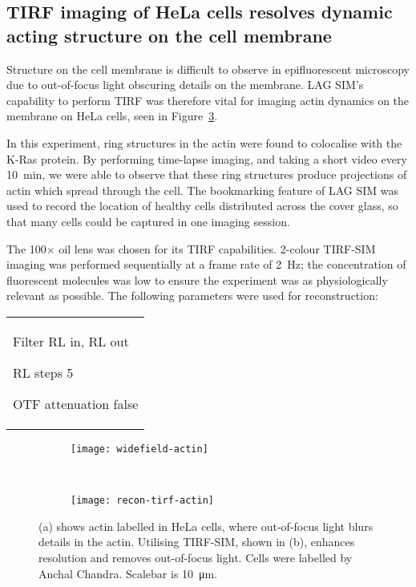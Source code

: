 \subsection{TIRF imaging of HeLa cells resolves dynamic acting structure on the cell membrane}
Structure on the cell membrane is difficult to observe in epifluorescent microscopy due to out-of-focus light obscuring details on the membrane. 
LAG SIM's capability to perform TIRF was therefore vital for imaging actin dynamics on the membrane on HeLa cells, seen in Figure~\ref{fig:recon-actin}. 

In this experiment, ring structures in the actin were found to colocalise with the K-Ras protein. 
By performing time-lapse imaging, and taking a short video every \SI{10}{\minute}, we were able to observe that these ring structures produce projections of actin which spread through the cell. 
The bookmarking feature of LAG SIM was used to record the location of healthy cells distributed across the cover glass, so that many cells could be captured in one imaging session. 

The 100$\times$ oil lens was chosen for its TIRF capabilities. 
2-colour TIRF-SIM imaging was performed sequentially at a frame rate of \SI{2}{\hertz}; the concentration of fluorescent molecules was low to ensure the experiment was as physiologically relevant as possible. 
The following parameters were used for reconstruction: \newline
\begin{tabular}{p{}}
\begin{labelling}[margin=OTF attenuation]
	\item[Filter] RL in, RL out
	\item[RL steps] 5
	\item[OTF attenuation] false
\end{labelling}
\end{tabular}


\begin{figure}[tbp!]
\centering
\begin{subfigure}[b]{0.7\textwidth}
	\texttt{[image: widefield-actin]}
	\caption{}\label{fig:widefield-actin}
\end{subfigure}

~\newline
\begin{subfigure}[b]{0.7\textwidth}
	\texttt{[image: recon-tirf-actin]}
	\caption{}\label{fig:recon-tirf-actin}
\end{subfigure}
\caption[LAG SIM: TIRF imaging of actin in HeLa cells removes out-of-focus light]{(a) shows actin labelled in HeLa cells, where out-of-focus light blurs details in the actin. Utilising TIRF-SIM, shown in (b), enhances resolution and removes out-of-focus light. Cells were labelled by Anchal Chandra. Scalebar is \SI{10}{\micro\metre}. }
\label{fig:recon-actin}
\end{figure}

